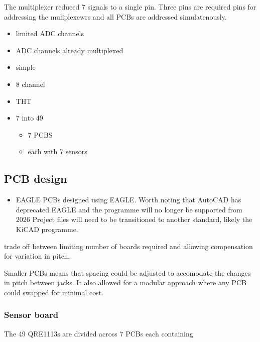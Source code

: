 The multiplexer reduced 7 signals to a single pin. Three pins are
required pins for addressing the muliplexewrs and all PCBs are addressed
simulatenously.

\begin{itemize}
\item
  limited ADC channels
\item
  ADC channels already multiplexed
\item
  simple
\item
  8 channel
\item
  THT
\item
  7 into 49

  \begin{itemize}
  \item
    7 PCBS
  \item
    each with 7 sensors
  \end{itemize}
\end{itemize}

\subsection{PCB design}\label{pcb-design}

\begin{itemize}
\item
  EAGLE PCBs designed using EAGLE. Worth noting that AutoCAD has
  deprecated EAGLE and the programme will no longer be supported from
  2026 Project files will need to be transitioned to another standard,
  likely the KiCAD programme.
\end{itemize}

trade off between limiting number of boards required and allowing
compensation for variation in pitch.

Smaller PCBs means that spacing could be adjusted to accomodate the
changes in pitch between jacks. It also allowed for a modular approach
where any PCB could swapped for minimal cost.

\subsubsection{Sensor board}\label{sensor-board}

The 49 QRE1113s are divided across 7 PCBs each containing

